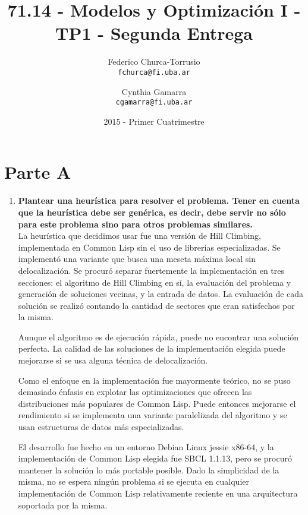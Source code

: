 \documentclass[10pt, a4paper, titlepage,
	oneside,
	fleqn, leqno]{article}
\title{71.14 - Modelos y Optimización I - TP1 - Segunda Entrega}
\author{
	Federico Churca-Torrusio \\\texttt{fchurca@fi.uba.ar}
	\and
	Cynthia Gamarra \\\texttt{cgamarra@fi.uba.ar}}
\date{2015 - Primer Cuatrimestre}
\let\oldsection\section
\def\section{\cleardoublepage\oldsection}
\begin{document}
\maketitle

\cleardoublepage
{}
\setcounter{page}{1}

\section{Parte A}
\begin{enumerate} [a .]
\item \textbf{Plantear una heurística para resolver el problema. Tener en cuenta que la heurística debe ser genérica, es decir, debe servir no sólo para este problema sino para otros problemas similares.}\\
	La heurística que decidimos usar fue una versión de Hill Climbing, implementada en Common Lisp sin el uso de librerías especializadas.
Se implementó una variante que busca una meseta máxima local sin delocalización.
Se procuró separar fuertemente la implementación en tres secciones: el algoritmo de Hill Climbing en sí, la evaluación del problema y generación de soluciones vecinas, y la entrada de datos.
La evaluación de cada solución se realizó contando la cantidad de sectores que eran satisfechos por la misma.

	Aunque el algoritmo es de ejecución rápida, puede no encontrar una solución perfecta.
La calidad de las soluciones de la implementación elegida puede mejorarse si se usa alguna técnica de delocalización.

	Como el enfoque en la implementación fue mayormente teórico, no se puso demasiado énfasis en explotar las optimizaciones que ofrecen las distribuciones más populares de Common Lisp.
Puede entonces mejorarse el rendimiento si se implementa una variante paralelizada del algoritmo y se usan estructuras de datos más especializadas.

	El desarrollo fue hecho en un entorno Debian Linux jessie x86-64, y la implementación de Common Lisp elegida fue SBCL 1.1.13, pero se procuró mantener la solución lo más portable posible.
Dado la simplicidad de la misma, no se espera ningún problema si se ejecuta en cualquier implementación de Common Lisp relativamente reciente en una arquitectura soportada por la misma.


\end{enumerate}
\end{document}
